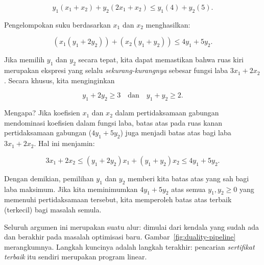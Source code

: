 \[
y_1(x_1 + x_2) + y_2(2x_1 + x_2) \leq y_1(4) + y_2(5).
\]

Pengelompokan suku berdasarkan $x_1$ dan $x_2$ menghasilkan:

\[
(x_1(y_1 + 2y_2)) + (x_2(y_1 + y_2)) \leq 4y_1 + 5y_2.
\]

Jika memilih $y_1$ dan $y_2$ secara tepat, kita dapat memastikan bahwa ruas kiri merupakan ekspresi yang selalu \emph{sekurang-kurangnya} sebesar fungsi laba $3x_1 + 2x_2$. Secara khusus, kita menginginkan

\[
y_1 + 2y_2 \geq 3 \quad \text{dan} \quad y_1 + y_2 \geq 2.
\]

Mengapa? Jika koefisien $x_1$ dan $x_2$ dalam pertidaksamaan gabungan mendominasi koefisien dalam fungsi laba, batas atas pada ruas kanan pertidaksamaan gabungan ($4y_1 + 5y_2$) juga menjadi batas atas bagi laba $3x_1 + 2x_2$. Hal ini menjamin:

\[
3x_1 + 2x_2 \leq (y_1+2y_2)x_1 + (y_1 + y_2)x_2 \leq 4y_1 + 5y_2.
\]

Dengan demikian, pemilihan $y_1$ dan $y_2$ memberi kita batas atas yang sah bagi laba maksimum. Jika kita meminimumkan $4y_1 + 5y_2$ atas semua $y_1, y_2 \geq 0$ yang memenuhi pertidaksamaan tersebut, kita memperoleh batas atas terbaik (terkecil) bagi masalah semula.

Seluruh argumen ini merupakan suatu alur: dimulai dari kendala yang sudah ada dan berakhir pada masalah optimisasi baru. Gambar~\ref{fig:duality-pipeline} merangkumnya. Langkah kuncinya adalah langkah terakhir: pencarian \emph{sertifikat terbaik} itu sendiri merupakan program linear.

